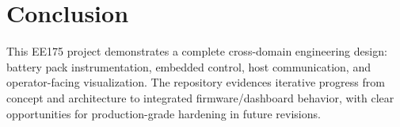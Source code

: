 \documentclass[12pt]{article}
\begin{document}
\section*{Conclusion}
This EE175 project demonstrates a complete cross-domain engineering design: battery pack instrumentation, embedded control, host communication, and operator-facing visualization. The repository evidences iterative progress from concept and architecture to integrated firmware/dashboard behavior, with clear opportunities for production-grade hardening in future revisions.
\end{document}
